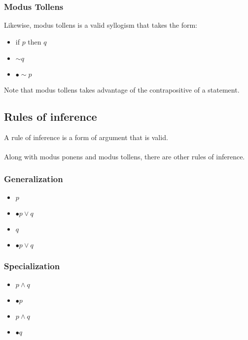\documentclass[a4paper]{article}
\begin{document}
\subsubsection{Modus Tollens}
Likewise, modus tollens is a valid syllogism that takes the form:
\begin{itemize}
	\itemsep0em
	\item[] if $p$ then $q$
	\item[] $\sim q$
	\item[] $\bullet \sim p$
\end{itemize}
Note that modus tollens takes advantage of the contrapositive of a statement.
\subsection{Rules of inference}
A rule of inference is a form of argument that is valid.\\ \\
Along with modus ponens and modus tollens, there are other rules of inference.
\subsubsection{Generalization}
\begin{varwidth}[t]{.5\textwidth}
	\begin{itemize}
		\itemsep0em
		\item[] $p$
		\item[] $\bullet p \lor q$
	\end{itemize}
\end{varwidth}
\hspace{4em}
\begin{varwidth}[t]{.5\textwidth}
	\begin{itemize}
		\itemsep0em
		\item[] $q$
		\item[] $\bullet p \lor q$
	\end{itemize}
\end{varwidth}
\subsubsection{Specialization}
\begin{varwidth}[t]{.5\textwidth}
	\begin{itemize}
		\itemsep0em
		\item[] $p \land q$
		\item[] $\bullet p$
	\end{itemize}
\end{varwidth}
\hspace{4em}
\begin{varwidth}[t]{.5\textwidth}
	\begin{itemize}
		\itemsep0em
		\item[] $p \land q$
		\item[] $\bullet q$
	\end{itemize}
\end{varwidth}
\end{document}
